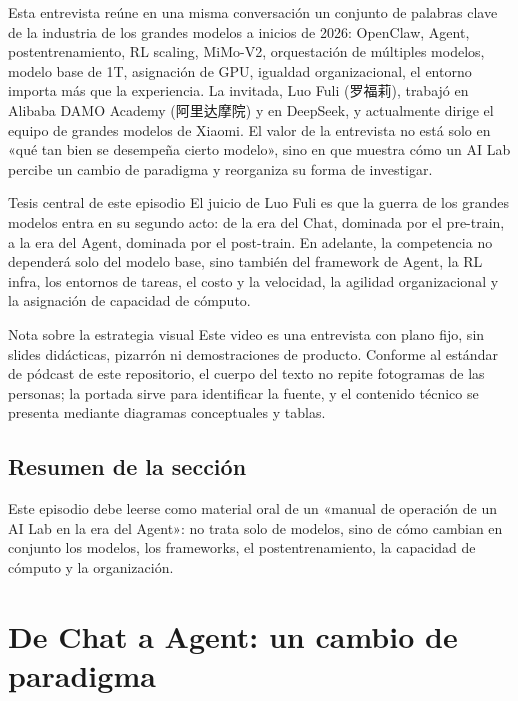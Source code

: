 \documentclass[a4paper]{article}
\begin{document}
Esta entrevista reúne en una misma conversación un conjunto de palabras clave de la industria de los grandes modelos a inicios de 2026: OpenClaw, Agent, postentrenamiento, RL scaling, MiMo-V2, orquestación de múltiples modelos, modelo base de 1T, asignación de GPU, igualdad organizacional, el entorno importa más que la experiencia. La invitada, Luo Fuli (罗福莉), trabajó en Alibaba DAMO Academy (阿里达摩院) y en DeepSeek, y actualmente dirige el equipo de grandes modelos de Xiaomi. El valor de la entrevista no está solo en «qué tan bien se desempeña cierto modelo», sino en que muestra cómo un AI Lab percibe un cambio de paradigma y reorganiza su forma de investigar.

\begin{importantbox}{Tesis central de este episodio}
El juicio de Luo Fuli es que la guerra de los grandes modelos entra en su segundo acto: de la era del Chat, dominada por el pre-train, a la era del Agent, dominada por el post-train. En adelante, la competencia no dependerá solo del modelo base, sino también del framework de Agent, la RL infra, los entornos de tareas, el costo y la velocidad, la agilidad organizacional y la asignación de capacidad de cómputo.
\end{importantbox}

\begin{knowledgebox}{Nota sobre la estrategia visual}
Este video es una entrevista con plano fijo, sin slides didácticas, pizarrón ni demostraciones de producto. Conforme al estándar de pódcast de este repositorio, el cuerpo del texto no repite fotogramas de las personas; la portada sirve para identificar la fuente, y el contenido técnico se presenta mediante diagramas conceptuales y tablas.
\end{knowledgebox}

\subsection{Resumen de la sección}

Este episodio debe leerse como material oral de un «manual de operación de un AI Lab en la era del Agent»: no trata solo de modelos, sino de cómo cambian en conjunto los modelos, los frameworks, el postentrenamiento, la capacidad de cómputo y la organización.
\section{De Chat a Agent: un cambio de paradigma}
\end{document}
